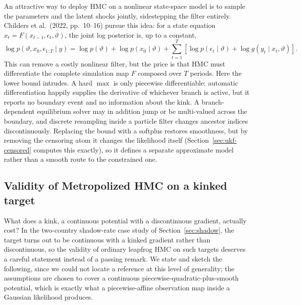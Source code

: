 \documentclass[11pt]{article}
\begin{document}
An attractive way to deploy HMC on a nonlinear state-space model is to
sample the parameters and the latent shocks jointly, sidestepping the filter
entirely. Childers et al.\ (2022, pp.~10--16) pursue this idea: for a state
equation $x_t=F(x_{t-1},\epsilon_t,\vartheta)$, the joint log posterior is,
up to a constant,
\begin{equation}\label{eq:56}
 \log p(\vartheta,x_0,\epsilon_{1:T}\mid y)
 =\log p(\vartheta)+\log p(x_0\mid\vartheta)
 +\sum_{t=1}^T\left[\log p(\epsilon_t\mid\vartheta)
 +\log g(y_t\mid x_t,\vartheta)\right].
\end{equation}
This can remove a costly nonlinear filter, but the price is that HMC must
differentiate the complete simulation map $F$ composed over $T$ periods. Here
the lower bound intrudes. A hard $\max$ is only piecewise differentiable:
automatic differentiation happily supplies the derivative of whichever branch
is active, but it reports no boundary event and no information about the
kink. A branch-dependent equilibrium solver may in addition jump or be
multi-valued across the boundary, and discrete resampling inside a particle
filter changes ancestor indices discontinuously. Replacing the bound with a
softplus restores smoothness, but by removing the censoring atom it changes
the likelihood itself (Section~\ref{sec:ukf-censored} computes this exactly),
so it defines a separate approximate model rather than a smooth route to the
constrained one.

\subsection{Validity of Metropolized HMC on a kinked target}\label{sec:kink-validity}

What does a kink, a continuous potential with a
discontinuous gradient, actually cost? In the two-country shadow-rate
case study of Section~\ref{sec:shadow}, the target turns out to be continuous
with a kinked gradient rather than discontinuous, so the validity of ordinary
leapfrog HMC on such targets deserves a careful statement instead of a
passing remark. We state and sketch the following, since we could not locate
a reference at this level of generality; the assumptions are chosen to cover
a continuous piecewise-quadratic-plus-smooth potential, which is exactly what
a piecewise-affine observation map inside a Gaussian likelihood produces.
\end{document}
